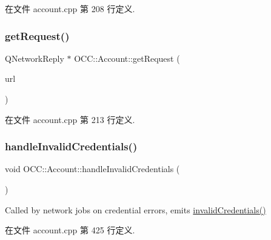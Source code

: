 在文件 account.\+cpp 第 208 行定义.

\mbox{\label{class_o_c_c_1_1_account_ac863fdcaaf178a8546fb93261ce120de}} 
\subsubsection{\texorpdfstring{get\+Request()}{getRequest()}\hspace{0.1cm}{\footnotesize\ttfamily [2/2]}}
{\footnotesize\ttfamily Q\+Network\+Reply $\ast$ O\+C\+C\+::\+Account\+::get\+Request (\begin{DoxyParamCaption}\item[{const Q\+Url \&}]{url }\end{DoxyParamCaption})}



在文件 account.\+cpp 第 213 行定义.

\mbox{\label{class_o_c_c_1_1_account_a3df5d30b88c86ec96f066a5a01373156}} 
\subsubsection{\texorpdfstring{handle\+Invalid\+Credentials()}{handleInvalidCredentials()}}
{\footnotesize\ttfamily void O\+C\+C\+::\+Account\+::handle\+Invalid\+Credentials (\begin{DoxyParamCaption}{ }\end{DoxyParamCaption})}



Called by network jobs on credential errors, emits \hyperlink{class_o_c_c_1_1_account_aeb4f6dd55bbe3c921f80bbc34bd82c0c}{invalid\+Credentials()} 



在文件 account.\+cpp 第 425 行定义.

\mbox{\label{class_o_c_c_1_1_account_aa7acb02216f5cc5d8d9057ab29b17fe4}} 
